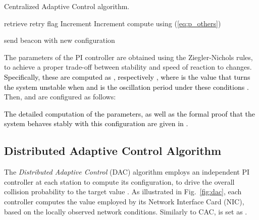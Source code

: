 \documentclass[a4paper,10pt]{article}
\newcommand{\revs}[1]{\textcolor{black}{#1}}
\begin{document}
\begin{algorithm}[!t]
 \caption{Centralized Adaptive Control algorithm.}
 \label{alg:cac}
 \begin{algorithmic}[1]
		\Repeat
					\State retrieve retry flag			
						\State Increment 
					\Else
						\State Increment 
					\EndIf
			\EndIf
		\State compute  using (\ref{eq:p_others}) 	
\State 	
\State 
		\State \hspace{4.2em} 
			
		\State send beacon with new  configuration
	\EndWhile
\end{algorithmic}
\end{algorithm}


The  parameters of the PI controller are obtained using the Ziegler-Nichols rules, to achieve a proper trade-off between stability and speed of reaction to changes.
\revs{Specifically, these are computed as , respectively , where  is the  value that turns the system unstable when  and  is the oscillation period under these conditions \cite{franklin}.} Then,  and  are configured as follows:


\revs{The detailed computation of the   parameters, as well as the formal proof that the system behaves stably with this configuration are given in \cite{patras09monet}.}



\subsection{Distributed Adaptive Control Algorithm}

The \emph{Distributed Adaptive Control} (DAC) algorithm \cite{patras10tmc} employs an independent PI controller at each station to compute its  configuration, to drive the overall collision probability to the target value . As illustrated in Fig.~\ref{fig:dac}, each controller computes the  value employed by its Network Interface Card (NIC), based on the locally observed network conditions. Similarly to CAC,  is set as .
\end{document}
